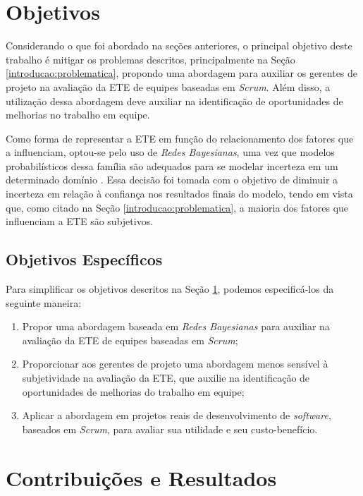 \section{Objetivos}
\label{introducao:objetivos}

Considerando o que foi abordado na seções anteriores, o principal objetivo deste trabalho é mitigar os problemas descritos, principalmente na Seção \ref{introducao:problematica}, propondo uma abordagem para auxiliar os gerentes de projeto na avaliação da ETE de equipes baseadas em \textit{Scrum}. Além disso, a utilização dessa abordagem deve auxiliar na identificação de oportunidades de melhorias no trabalho em equipe.

Como forma de representar a ETE em função do relacionamento dos fatores que a influenciam, optou-se pelo uso de \textit{Redes Bayesianas}, uma vez que modelos probabilísticos dessa família são adequados para se modelar incerteza em um determinado domínio \cite{bengal}. Essa decisão foi tomada com o objetivo de diminuir a incerteza em relação à confiança nos resultados finais do modelo, tendo em vista que, como citado na Seção \ref{introducao:problematica}, a maioria dos fatores que influenciam a ETE são subjetivos.

\subsection{Objetivos Específicos}
\label{introducao:objetivos:especificos}

Para simplificar os objetivos descritos na Seção \ref{introducao:objetivos}, podemos especificá-los da seguinte maneira:

\begin{enumerate}
  \item Propor uma abordagem baseada em \textit{Redes Bayesianas} para auxiliar na avaliação da ETE de equipes baseadas em \textit{Scrum};
  \item Proporcionar aos gerentes de projeto uma abordagem menos sensível à subjetividade na avaliação da ETE, que auxilie na identificação de oportunidades de melhorias do trabalho em equipe;
  \item Aplicar a abordagem em projetos reais de desenvolvimento de \textit{software}, baseados em \textit{Scrum}, para avaliar sua utilidade e seu custo-benefício.
\end{enumerate}

\section{Contribuições e Resultados}
\label{introducao:resultados}


